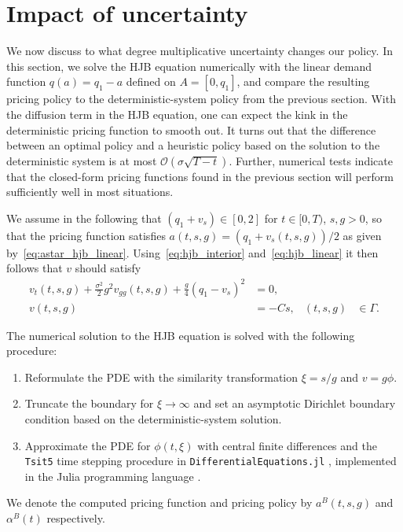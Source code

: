 \documentclass[main.tex]{subfiles}
\begin{document}
\section{Impact of uncertainty}\label{sec:stochastic_hjb}
We now discuss to what degree multiplicative uncertainty changes
our policy. In this section, we solve the HJB equation numerically with the linear
demand function $q(a)=q_1-a$ defined on $A=[0,q_1]$, and compare the
resulting pricing policy to the
deterministic-system policy from the previous section.
With the diffusion term in the HJB equation, one can
expect the kink in the deterministic pricing function to smooth
out. It turns out that the difference between an optimal
policy and a heuristic policy based on the solution
to the deterministic system is at most
$\mathcal{O}(\sigma \sqrt{T-t})$. Further, numerical tests indicate that the
closed-form pricing functions found in the previous section will
perform sufficiently well in most situations.

We assume in the following that $(q_1+v_s)\in[0,2]$ for
$t\in[0,T)$, $s,g>0$, so
that the pricing function satisfies $a(t,s,g) = (q_1+v_s(t,s,g))/2$ as
given by~\eqref{eq:astar_hjb_linear}.
Using~\eqref{eq:hjb_interior} and~\eqref{eq:hjb_linear} it then
follows that $v$ should satisfy
\begin{align}\label{eq:hjb_impact_uncertainty}
  v_t(t,s,g)+\frac{\sigma^2}{2} g^2v_{gg}(t,s,g)
  +\frac{g}{4}{(q_1-v_s)}^2
  &= 0, \\%
  v(t,s,g) &= -Cs,&(t,s,g)&\in \Gamma.
\end{align}

The numerical solution to the HJB equation is solved with the
following procedure:
\begin{enumerate}
\item Reformulate the PDE with the similarity
  transformation $\xi = s/g$ and $v = g\phi$.
\item Truncate the boundary
  for $\xi\to\infty$ and set an asymptotic Dirichlet boundary condition
  based on the deterministic-system solution.
\item Approximate
  the PDE for $\phi(t,\xi)$ with central finite differences and the
  \texttt{Tsit5} time stepping procedure in
  \texttt{DifferentialEquations.jl}
  \citep{rackauckas2017differentialequations}, implemented in the Julia
  programming language \citep{bezanson2017julia}.
\end{enumerate}
We denote the computed pricing function and pricing
policy by $a^B(t,s,g)$ and $\alpha^B(t)$ respectively.
\end{document}
